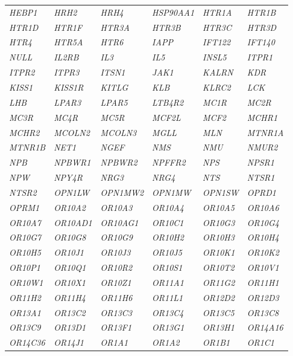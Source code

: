 {\begin{longtable}{>{\em}l>{\em}l>{\em}l>{\em}l>{\em}l>{\em}l}
  HEBP1 & HRH2 & HRH4 & HSP90AA1 & HTR1A & HTR1B \\ 
  \rowcolor{black!10} 
  HTR1D & HTR1F & HTR3A & HTR3B & HTR3C & HTR3D \\ 
  \rowcolor{black!5} 
  HTR4 & HTR5A & HTR6 & IAPP & IFT122 & IFT140 \\ 
  \rowcolor{black!10} 
  NULL & IL2RB & IL3 & IL5 & INSL5 & ITPR1 \\ 
  \rowcolor{black!5} 
  ITPR2 & ITPR3 & ITSN1 & JAK1 & KALRN & KDR \\ 
  \rowcolor{black!10} 
  KISS1 & KISS1R & KITLG & KLB & KLRC2 & LCK \\ 
  \rowcolor{black!5} 
  LHB & LPAR3 & LPAR5 & LTB4R2 & MC1R & MC2R \\ 
  \rowcolor{black!10} 
  MC3R & MC4R & MC5R & MCF2L & MCF2 & MCHR1 \\ 
  \rowcolor{black!5} 
  MCHR2 & MCOLN2 & MCOLN3 & MGLL & MLN & MTNR1A \\ 
  \rowcolor{black!10} 
  MTNR1B & NET1 & NGEF & NMS & NMU & NMUR2 \\ 
  \rowcolor{black!5} 
  NPB & NPBWR1 & NPBWR2 & NPFFR2 & NPS & NPSR1 \\ 
  \rowcolor{black!10} 
  NPW & NPY4R & NRG3 & NRG4 & NTS & NTSR1 \\ 
  \rowcolor{black!5} 
  NTSR2 & OPN1LW & OPN1MW2 & OPN1MW & OPN1SW & OPRD1 \\ 
  \rowcolor{black!10} 
  OPRM1 & OR10A2 & OR10A3 & OR10A4 & OR10A5 & OR10A6 \\ 
  \rowcolor{black!5} 
  OR10A7 & OR10AD1 & OR10AG1 & OR10C1 & OR10G3 & OR10G4 \\ 
  \rowcolor{black!10} 
  OR10G7 & OR10G8 & OR10G9 & OR10H2 & OR10H3 & OR10H4 \\ 
  \rowcolor{black!5} 
  OR10H5 & OR10J1 & OR10J3 & OR10J5 & OR10K1 & OR10K2 \\ 
  \rowcolor{black!10} 
  OR10P1 & OR10Q1 & OR10R2 & OR10S1 & OR10T2 & OR10V1 \\ 
  \rowcolor{black!5} 
  OR10W1 & OR10X1 & OR10Z1 & OR11A1 & OR11G2 & OR11H1 \\ 
  \rowcolor{black!10} 
  OR11H2 & OR11H4 & OR11H6 & OR11L1 & OR12D2 & OR12D3 \\ 
  \rowcolor{black!5} 
  OR13A1 & OR13C2 & OR13C3 & OR13C4 & OR13C5 & OR13C8 \\ 
  \rowcolor{black!10} 
  OR13C9 & OR13D1 & OR13F1 & OR13G1 & OR13H1 & OR14A16 \\ 
  \rowcolor{black!5} 
  OR14C36 & OR14J1 & OR1A1 & OR1A2 & OR1B1 & OR1C1 \\ 

\end{longtable}}
